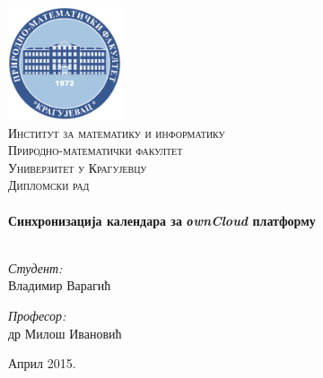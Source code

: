 %
%

\begin{titlepage}

\begin{center}

\includegraphics[width=0.25\textwidth]{logo-pmf.pdf}\\[1cm]

\textsc{\LARGE Институт за математику и информатику
\\ Природно-математички факултет
\\ Универзитет у Крагујевцу}\\[1.5cm]

\textsc{\Large Дипломски рад}\\[0.5cm]

\HRule \\[0.4cm]
{ \huge \bfseries Синхронизација календара за \textit{оwnCloud} платформу}\\[0.4cm]

\HRule \\[1.5cm]

\begin{minipage}{0.4\textwidth}
\begin{flushleft} \large
\emph{Студент:}\\
Владимир Варагић
\end{flushleft}
\end{minipage}
\begin{minipage}{0.4\textwidth}
\begin{flushright} \large
\emph{Професор:} \\
др Милош Ивановић
\end{flushright}
\end{minipage}

\vfill

{\large Април 2015.}

\end{center}

\end{titlepage}

